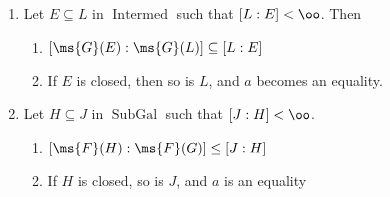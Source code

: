 \documentclass[x11names,reqno,14pt]{extarticle}
\DeclareMathOperator{\Intermed}{Intermed}
\DeclareMathOperator{\SubGal}{SubGal}
\begin{document}
\begin{enumerate}

\item Let $E \subseteq L$ in $\Intermed$ such that $[L:E] < \oo$. Then
\begin{enumerate}[label=(\alph*)]

\item $[\ms{G}(E): \ms{G}(L)] \subseteq [L:E]$ 

\item If $E$ is closed, then so is $L$, and $a$ becomes an equality. 

\end{enumerate}

\item Let $H \subseteq J$ in $\SubGal$ such that $[J:H]<\oo$. 

\begin{enumerate}[label=(\alph*)]

\item $[\ms{F}(H):\ms{F}(G)] \leq [J:H]$

\item If $H$ is closed, so is $J$, and $a$ is an equality

\end{enumerate}

\end{enumerate}

\proof\,
\end{document}
